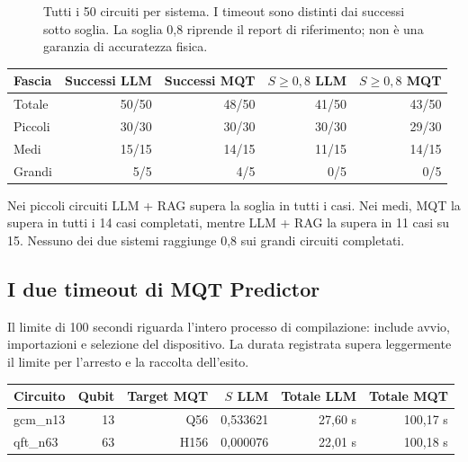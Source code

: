 \documentclass[11pt,a4paper]{article}
\begin{document}
\begin{figure}[H]\centering
{}
\caption{Tutti i 50 circuiti per sistema. I timeout sono distinti dai successi sotto soglia. La soglia 0,8 riprende il report di riferimento; non è una garanzia di accuratezza fisica.}
\end{figure}

\begin{center}
\small
\setlength{\tabcolsep}{5pt}
\begin{tabular}{lrrrr}
\toprule
Fascia & Successi LLM & Successi MQT & $S\geq0{,}8$ LLM & $S\geq0{,}8$ MQT\\
\midrule
Totale & 50/50 & 48/50 & 41/50 & 43/50\\
Piccoli & 30/30 & 30/30 & 30/30 & 29/30\\
Medi & 15/15 & 14/15 & 11/15 & 14/15\\
Grandi & 5/5 & 4/5 & 0/5 & 0/5\\
\bottomrule
\end{tabular}\end{center}

Nei piccoli circuiti LLM + RAG supera la soglia in tutti i casi. Nei medi,
MQT la supera in tutti i 14 casi completati, mentre LLM + RAG la supera in 11 casi su 15.
Nessuno dei due sistemi raggiunge 0,8 sui grandi circuiti completati.
\subsection*{I due timeout di MQT Predictor}
Il limite di 100 secondi riguarda l'intero processo di compilazione: include avvio,
importazioni e selezione del dispositivo. La durata registrata supera leggermente
il limite per l'arresto e la raccolta dell'esito.

\begin{center}
\small
\setlength{\tabcolsep}{5pt}
\begin{tabular}{lrrrrr}
\toprule
Circuito & Qubit & Target MQT & $S$ LLM & Totale LLM & Totale MQT\\
\midrule
gcm\_n13 & 13 & Q56 & 0,533621 & 27,60 s & 100,17 s\\
qft\_n63 & 63 & H156 & 0,000076 & 22,01 s & 100,18 s\\
\bottomrule
\end{tabular}\end{center}
\end{document}
